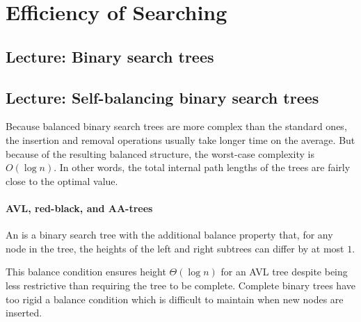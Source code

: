 \part{Efficiency of Searching}  
\label{ch:effsearch}

\chapter{Lecture: Binary search trees}

\chapter{Lecture: Self-balancing binary search trees} \label{sec:balanced}
Because balanced binary search trees are more complex than the standard
ones, the insertion and removal operations usually take
longer time on the average. But because of the resulting balanced structure,
the worst-case complexity is $O(\log n)$. In
other words, the total internal path lengths of the trees are fairly close to
the optimal value.

\subsection{AVL, red-black, and AA-trees}
\label{ss:avl}

\begin{Definition}
An  is a binary search tree 
with the additional
balance property that, for any node in the tree, the heights of
the left and right subtrees can differ by at most $1$. 
\end{Definition}

This balance condition ensures height $\Theta(\log n)$
for an AVL tree despite being less restrictive than requiring the tree to be 
complete. Complete binary trees have too rigid  a balance condition 
which is difficult to maintain when new nodes are inserted.

